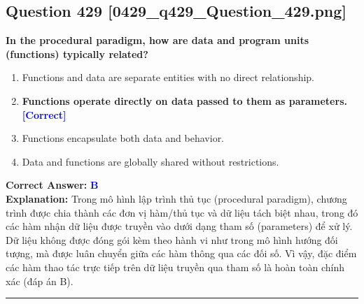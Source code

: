 \documentclass[11pt,a4paper]{article}
\begin{document}
\begin{minipage}{\textwidth}
\subsection*{Question 429 \quad \footnotesize{[0429\_q429\_Question\_429.png]}}
\noindent \textbf{In the procedural paradigm, how are data and program units (functions) typically related?}

\begin{enumerate}[label=\Alph*.]
    \item Functions and data are separate entities with no direct relationship.
    \item \textbf{Functions operate directly on data passed to them as parameters.} \hfill \textcolor{blue}{\textbf{[Correct]}}
    \item Functions encapsulate both data and behavior.
    \item Data and functions are globally shared without restrictions.
\end{enumerate}

\noindent \textbf{Correct Answer:} \textcolor{blue}{\textbf{B}} \\[2pt]
\noindent \textbf{Explanation:} Trong mô hình lập trình thủ tục (procedural paradigm), chương trình được chia thành các đơn vị hàm/thủ tục và dữ liệu tách biệt nhau, trong đó các hàm nhận dữ liệu được truyền vào dưới dạng tham số (parameters) để xử lý. Dữ liệu không được đóng gói kèm theo hành vi như trong mô hình hướng đối tượng, mà được luân chuyển giữa các hàm thông qua các đối số. Vì vậy, đặc điểm các hàm thao tác trực tiếp trên dữ liệu truyền qua tham số là hoàn toàn chính xác (đáp án B).

\par\vspace{0.3cm}
\hrule
\vspace{0.3cm}
\end{minipage}
\end{document}
